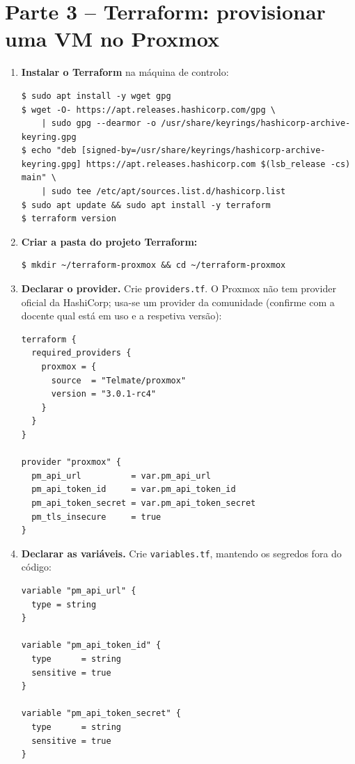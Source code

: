 \documentclass[11pt,a4paper]{article}
\begin{document}
\section{Parte 3 -- Terraform: provisionar uma VM no Proxmox}
\begin{enumerate}[label=\arabic*.,resume]

  \item \textbf{Instalar o Terraform} na máquina de controlo:
\begin{lstlisting}
$ sudo apt install -y wget gpg
$ wget -O- https://apt.releases.hashicorp.com/gpg \
    | sudo gpg --dearmor -o /usr/share/keyrings/hashicorp-archive-keyring.gpg
$ echo "deb [signed-by=/usr/share/keyrings/hashicorp-archive-keyring.gpg] https://apt.releases.hashicorp.com $(lsb_release -cs) main" \
    | sudo tee /etc/apt/sources.list.d/hashicorp.list
$ sudo apt update && sudo apt install -y terraform
$ terraform version
\end{lstlisting}

  \item \textbf{Criar a pasta do projeto Terraform:}
\begin{lstlisting}
$ mkdir ~/terraform-proxmox && cd ~/terraform-proxmox
\end{lstlisting}

  \item \textbf{Declarar o provider.} Crie \texttt{providers.tf}. O Proxmox não tem provider oficial da HashiCorp; usa-se um provider da comunidade (confirme com a docente qual está em uso e a respetiva versão):
\begin{lstlisting}
terraform {
  required_providers {
    proxmox = {
      source  = "Telmate/proxmox"
      version = "3.0.1-rc4"
    }
  }
}

provider "proxmox" {
  pm_api_url          = var.pm_api_url
  pm_api_token_id     = var.pm_api_token_id
  pm_api_token_secret = var.pm_api_token_secret
  pm_tls_insecure     = true
}
\end{lstlisting}

  \item \textbf{Declarar as variáveis.} Crie \texttt{variables.tf}, mantendo os segredos fora do código:
\begin{lstlisting}
variable "pm_api_url" {
  type = string
}

variable "pm_api_token_id" {
  type      = string
  sensitive = true
}

variable "pm_api_token_secret" {
  type      = string
  sensitive = true
}


\end{lstlisting}
\end{enumerate}
\end{document}
